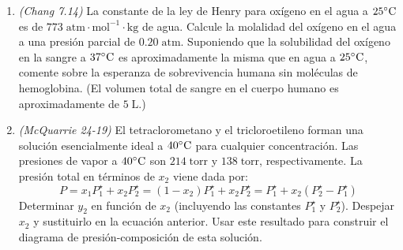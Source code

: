 \documentclass[a4paper,12pt]{article}
\begin{document}
\begin{enumerate}
 \item \textit{(Chang 7.14)} La constante de la ley de Henry para ox\'igeno en el agua a $25\celsius$ es de $773\;\mbox{atm}\cdot\mbox{mol}^{-1}\cdot\mbox{kg}$ de agua. Calcule la molalidad del ox\'igeno en el agua a una presi\'on parcial de $0.20\;\mbox{atm}$. Suponiendo que la solubilidad del ox\'igeno en la sangre a $37\celsius$ es aproximadamente la misma que en agua a $25\celsius$, comente sobre la esperanza de sobrevivencia humana sin mol\'eculas de hemoglobina. (El volumen total de sangre en el cuerpo humano es aproximadamente de $5\;\mbox{L}$.) %

 \item \textit{(McQuarrie 24-19)} El tetraclorometano y el tricloroetileno forman una solución esencialmente ideal a $40\celsius$ para cualquier concentración. Las presiones de vapor a $40\celsius$ son $214\;\mbox{torr}$ y $138\;\mbox{torr}$, respectivamente. La presi\'on total en t\'erminos de $x_2$ viene dada por:
$$P=x_1P_1^\star+x_2P_2^\star=(1-x_2)P_1^\star+x_2P_2^\star=P_1^\star+x_2(P_2^\star-P_1^\star)$$
Determinar $y_2$ en funci\'on de $x_2$ (incluyendo las constantes $P_1^\star$ y $P_2^\star$). Despejar $x_2$ y sustituirlo en la ecuaci\'on anterior. Usar este resultado para construir el diagrama de presi\'on-composici\'on de esta soluci\'on. %

\end{enumerate}
 
\end{document}
